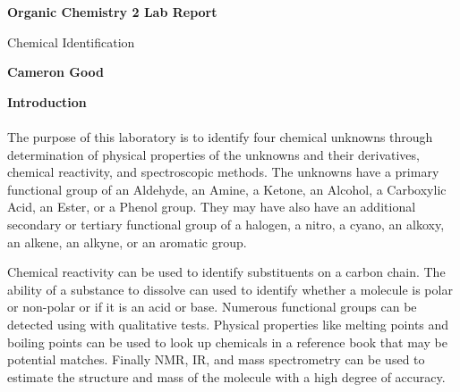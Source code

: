 \thispagestyle{plain}
\begin{center}
	\Large
	\textbf{Organic Chemistry 2 Lab Report}
	
	\vspace{0.4cm}
	\large
	Chemical Identification
	
	\vspace{0.4cm}
	\textbf{Cameron Good}
	
	\vspace{0.9cm}
	\textbf{Introduction}
\end{center}
\paragraph{}
The purpose of this laboratory is to identify four chemical unknowns through determination of physical properties of the unknowns and their derivatives, chemical reactivity, and spectroscopic methods. The unknowns have a primary functional group of an Aldehyde, an Amine, a Ketone, an Alcohol, a Carboxylic Acid, an Ester, or a Phenol group. They may have also have an additional secondary or tertiary functional group of a halogen, a nitro, a cyano, an alkoxy, an alkene, an alkyne, or an aromatic group.

Chemical reactivity can be used to identify substituents on a carbon chain. The ability of a substance to dissolve can used to identify whether a molecule is polar or non-polar or if it is an acid or base. Numerous functional groups can be detected using with qualitative tests. Physical properties like melting points and boiling points can be used to look up chemicals in a reference book that may be potential matches. Finally NMR, IR, and mass spectrometry can be used to estimate the structure and mass of the molecule with a high degree of accuracy.

